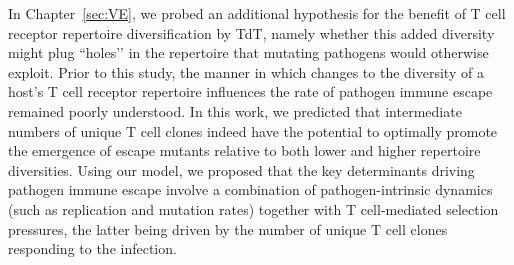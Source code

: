 In Chapter~\ref{sec:VE}, we probed an additional hypothesis for the benefit of T cell receptor repertoire diversification by TdT, namely whether this added diversity might plug ``holes’’ in the repertoire that mutating pathogens would otherwise exploit. Prior to this study, the manner in which changes to the diversity of a host’s T cell receptor repertoire influences the rate of pathogen immune escape remained poorly understood. In this work, we predicted that intermediate numbers of unique T cell clones indeed have the potential to optimally promote the emergence of escape mutants relative to both lower and higher repertoire diversities. Using our model, we proposed that the key determinants driving pathogen immune escape involve a combination of pathogen-intrinsic dynamics (such as replication and mutation rates) together with T cell-mediated selection pressures, the latter being driven by the number of unique T cell clones responding to the infection.

\hypersetup{linkcolor=black}